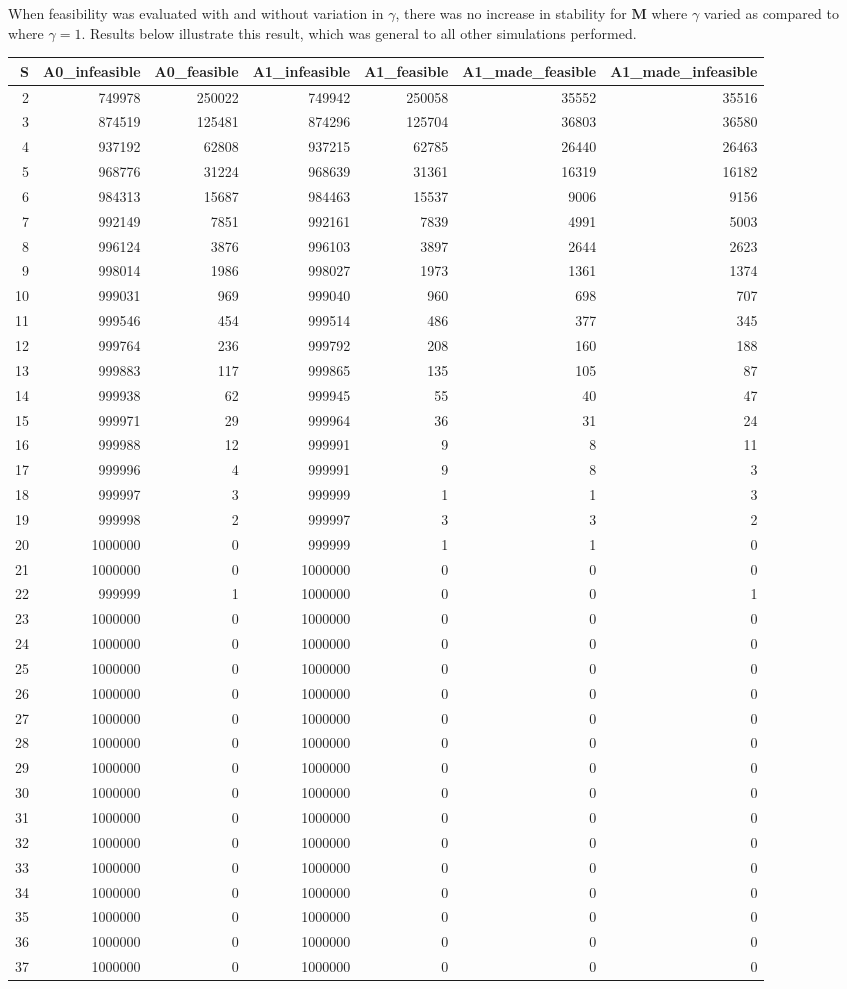 \documentclass[]{article}
\begin{document}
When feasibility was evaluated with and without variation in \(\gamma\),
there was no increase in stability for \(\mathbf{M}\) where \(\gamma\)
varied as compared to where \(\gamma = 1\). Results below illustrate
this result, which was general to all other simulations performed.

\begin{longtable}[]{@{}rrrrrrr@{}}
\toprule
S & A0\_infeasible & A0\_feasible & A1\_infeasible & A1\_feasible &
A1\_made\_feasible & A1\_made\_infeasible\tabularnewline
\midrule
\endhead
2 & 749978 & 250022 & 749942 & 250058 & 35552 & 35516\tabularnewline
3 & 874519 & 125481 & 874296 & 125704 & 36803 & 36580\tabularnewline
4 & 937192 & 62808 & 937215 & 62785 & 26440 & 26463\tabularnewline
5 & 968776 & 31224 & 968639 & 31361 & 16319 & 16182\tabularnewline
6 & 984313 & 15687 & 984463 & 15537 & 9006 & 9156\tabularnewline
7 & 992149 & 7851 & 992161 & 7839 & 4991 & 5003\tabularnewline
8 & 996124 & 3876 & 996103 & 3897 & 2644 & 2623\tabularnewline
9 & 998014 & 1986 & 998027 & 1973 & 1361 & 1374\tabularnewline
10 & 999031 & 969 & 999040 & 960 & 698 & 707\tabularnewline
11 & 999546 & 454 & 999514 & 486 & 377 & 345\tabularnewline
12 & 999764 & 236 & 999792 & 208 & 160 & 188\tabularnewline
13 & 999883 & 117 & 999865 & 135 & 105 & 87\tabularnewline
14 & 999938 & 62 & 999945 & 55 & 40 & 47\tabularnewline
15 & 999971 & 29 & 999964 & 36 & 31 & 24\tabularnewline
16 & 999988 & 12 & 999991 & 9 & 8 & 11\tabularnewline
17 & 999996 & 4 & 999991 & 9 & 8 & 3\tabularnewline
18 & 999997 & 3 & 999999 & 1 & 1 & 3\tabularnewline
19 & 999998 & 2 & 999997 & 3 & 3 & 2\tabularnewline
20 & 1000000 & 0 & 999999 & 1 & 1 & 0\tabularnewline
21 & 1000000 & 0 & 1000000 & 0 & 0 & 0\tabularnewline
22 & 999999 & 1 & 1000000 & 0 & 0 & 1\tabularnewline
23 & 1000000 & 0 & 1000000 & 0 & 0 & 0\tabularnewline
24 & 1000000 & 0 & 1000000 & 0 & 0 & 0\tabularnewline
25 & 1000000 & 0 & 1000000 & 0 & 0 & 0\tabularnewline
26 & 1000000 & 0 & 1000000 & 0 & 0 & 0\tabularnewline
27 & 1000000 & 0 & 1000000 & 0 & 0 & 0\tabularnewline
28 & 1000000 & 0 & 1000000 & 0 & 0 & 0\tabularnewline
29 & 1000000 & 0 & 1000000 & 0 & 0 & 0\tabularnewline
30 & 1000000 & 0 & 1000000 & 0 & 0 & 0\tabularnewline
31 & 1000000 & 0 & 1000000 & 0 & 0 & 0\tabularnewline
32 & 1000000 & 0 & 1000000 & 0 & 0 & 0\tabularnewline
33 & 1000000 & 0 & 1000000 & 0 & 0 & 0\tabularnewline
34 & 1000000 & 0 & 1000000 & 0 & 0 & 0\tabularnewline
35 & 1000000 & 0 & 1000000 & 0 & 0 & 0\tabularnewline
36 & 1000000 & 0 & 1000000 & 0 & 0 & 0\tabularnewline
37 & 1000000 & 0 & 1000000 & 0 & 0 & 0\tabularnewline

\end{longtable}
\end{document}

